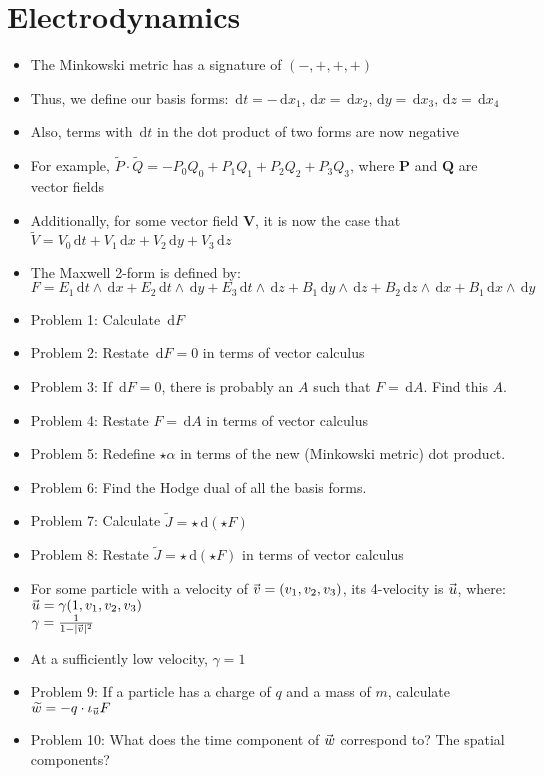 \documentclass[a4paper,11pt]{report}
\newcommand{\diff}{\ensuremath{\, \mathrm{d}}}
\DeclarePairedDelimiter{\abs}{\lvert}{\rvert}
\DeclareRobustCommand{\zvec}[1]{%
  \mathrlap{\vec{\mkern-2mu\phantom{#1}}}#1%
}
\begin{document}
\section{Electrodynamics}
\begin{itemize} \itemsep -2pt
    \item The Minkowski metric has a signature of $(-, +, +, +)$
    \item Thus, we define our basis forms: $\diff t = -\diff x_1, \diff x = \diff x_2, \diff y = \diff x_3, \diff z = \diff x_4$
    \item Also, terms with $\diff t$ in the dot product of two forms are now negative
    \item For example, $\widetilde{P} \cdot \widetilde{Q} = -P_0 Q_0 + P_1 Q_1 + P_2 Q_2 + P_3 Q_3$, where $\mathbf{P}$ and $\mathbf{Q}$ are vector fields
    \item Additionally, for some vector field $\mathbf{V}$, it is now the case that $\widetilde{V} = V_0 \diff t + V_1 \diff x + V_2 \diff y + V_3 \diff z$
    \item The Maxwell 2-form is defined by: \\
        $F = E_1 \diff t \wedge \diff x + E_2 \diff t \wedge \diff y + E_3 \diff t \wedge \diff z + B_1 \diff y \wedge \diff z + B_2 \diff z \wedge \diff x + B_1 \diff x \wedge \diff y$
    \item Problem 1: Calculate $\diff F$
    \item Problem 2: Restate $\diff F = 0$ in terms of vector calculus
    \item Problem 3: If $\diff F = 0$, there is probably an $A$ such that $F = \diff A$. Find this $A$.
    \item Problem 4: Restate $F = \diff A$ in terms of vector calculus
    \item Problem 5: Redefine $\star \alpha$ in terms of the new (Minkowski metric) dot product.
    \item Problem 6: Find the Hodge dual of all the basis forms.
    \item Problem 7: Calculate $\widetilde{J} = \star \diff (\star F)$
    \item Problem 8: Restate $\widetilde{J} = \star \diff (\star F)$ in terms of vector calculus
    \item For some particle with a velocity of $\zvec{v} = (v_1, v_2, v_3)$, its 4-velocity is $\zvec{u}$, where: \\
        $\zvec{u} = \gamma(1, v_1, v_2, v_3)$ \\
        $\gamma = \frac{1}{1 - \abs{\zvec{v}}^2}$
    \item At a sufficiently low velocity, $\gamma = 1$
    \item Problem 9: If a particle has a charge of $q$ and a mass of $m$, calculate $\widetilde{w} = -q \cdot \iota_{\zvec{u}} F$
    \item Problem 10: What does the time component of $\zvec{w}$ correspond to? The spatial components?
\end{itemize}
\end{document}
